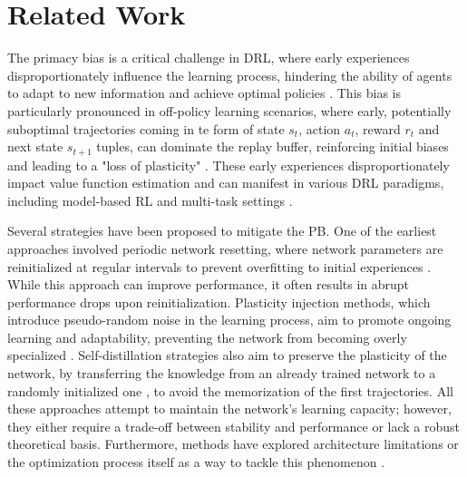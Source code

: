 \section{Related Work}
The primacy bias is a critical challenge in DRL, where early experiences disproportionately influence the learning process, hindering the ability of agents to adapt to new information and achieve optimal policies \cite{nikishin2022primacy}. This bias is particularly pronounced in off-policy learning scenarios, where early, potentially suboptimal trajectories coming in te form of state $s_t$, action $a_t$, reward $r_t$ and next state $s_{t+1}$ tuples, can dominate the replay buffer, reinforcing initial biases and leading to a "loss of plasticity" \cite{abbas2023loss, d2022sample}. These early experiences disproportionately impact value function estimation \cite{lyle2022learning, lyle2022understanding, van2018deep} and can manifest in various DRL paradigms, including model-based RL \cite{qiao2023primacy} and multi-task settings \cite{chohard}.

Several strategies have been proposed to mitigate the PB. One of the earliest approaches involved periodic network resetting, where network parameters are reinitialized at regular intervals to prevent overfitting to initial experiences \cite{nikishin2022primacy}. While this approach can improve performance, it often results in abrupt performance drops upon reinitialization. Plasticity injection methods, which introduce pseudo-random noise in the learning process, aim to promote ongoing learning and adaptability, preventing the network from becoming overly specialized \cite{sokar2023dormant, nikishin2024deep}. Self-distillation strategies also aim to preserve the plasticity of the network, by transferring the knowledge from an already trained network to a randomly initialized one \cite{li2024eliminating}, to avoid the memorization of the first trajectories. All these approaches attempt to maintain the network's learning capacity; however, they either require a trade-off between stability and performance or lack a robust theoretical basis. Furthermore, methods have explored architecture limitations or the optimization process itself as a way to tackle this phenomenon \cite{obando2024value, asadi2024resetting, li2023efficient}.

